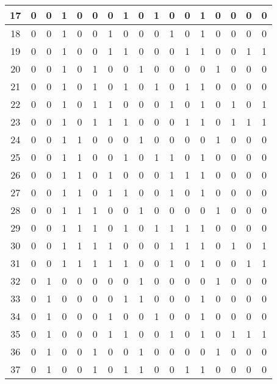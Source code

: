 \documentclass[12pt, oneside, openany]{article}
\begin{document}
{\begin{longtable}[c]{|c||c|c|c|c|c|c|c||c|c|c|c|c|c|c|c|c|}
    \hline
    17 & 0 &  0 & 1 & 0 & 0 & 0 & 1 &  0 & 1 & 0 & 0 &  1 &  0 & 0 & 0 & 0 \\
    \hline
    18 & 0 &  0 & 1 & 0 & 0 & 1 & 0 &  0 & 0 & 1 & 0 &  1 &  0 & 0 & 0 & 0 \\
    \hline
    19 & 0 &  0 & 1 & 0 & 0 & 1 & 1 &  0 & 0 & 0 & 1 &  1 &  0 & 0 & 1 & 1 \\
    \hline
    20 & 0 &  0 & 1 & 0 & 1 & 0 & 0 &  1 & 0 & 0 & 0 &  0 &  1 & 0 & 0 & 0 \\
    \hline
    21 & 0 &  0 & 1 & 0 & 1 & 0 & 1 &  0 & 1 & 0 & 1 &  1 &  0 & 0 & 0 & 0 \\
    \hline
    22 & 0 &  0 & 1 & 0 & 1 & 1 & 0 &  0 & 0 & 1 & 0 &  1 &  0 & 1 & 0 & 1 \\
    \hline
    23 & 0 &  0 & 1 & 0 & 1 & 1 & 1 &  0 & 0 & 0 & 1 &  1 &  0 & 1 & 1 & 1 \\
    \hline
    24 & 0 &  0 & 1 & 1 & 0 & 0 & 0 &  1 & 0 & 0 & 0 &  0 &  1 & 0 & 0 & 0 \\
    \hline
    25 & 0 &  0 & 1 & 1 & 0 & 0 & 1 &  0 & 1 & 1 & 0 &  1 &  0 & 0 & 0 & 0 \\
    \hline
    26 & 0 &  0 & 1 & 1 & 0 & 1 & 0 &  0 & 0 & 1 & 1 &  1 &  0 & 0 & 0 & 0 \\
    \hline
    27 & 0 &  0 & 1 & 1 & 0 & 1 & 1 &  0 & 0 & 1 & 0 &  1 &  0 & 0 & 0 & 0 \\
    \hline
    28 & 0 &  0 & 1 & 1 & 1 & 0 & 0 &  1 & 0 & 0 & 0 &  0 &  1 & 0 & 0 & 0 \\
    \hline
    29 & 0 &  0 & 1 & 1 & 1 & 0 & 1 &  0 & 1 & 1 & 1 &  1 &  0 & 0 & 0 & 0 \\
    \hline
    30 & 0 &  0 & 1 & 1 & 1 & 1 & 0 &  0 & 0 & 1 & 1 &  1 &  0 & 1 & 0 & 1 \\
    \hline
    31 & 0 &  0 & 1 & 1 & 1 & 1 & 1 &  0 & 0 & 1 & 0 &  1 &  0 & 0 & 1 & 1 \\
    \hline
    32 & 0 &  1 & 0 & 0 & 0 & 0 & 0 &  1 & 0 & 0 & 0 &  0 &  1 & 0 & 0 & 0 \\
    \hline
    33 & 0 &  1 & 0 & 0 & 0 & 0 & 1 &  1 & 0 & 0 & 0 &  1 &  0 & 0 & 0 & 0 \\
    \hline
    34 & 0 &  1 & 0 & 0 & 0 & 1 & 0 &  0 & 1 & 0 & 0 &  1 &  0 & 0 & 0 & 0 \\
    \hline
    35 & 0 &  1 & 0 & 0 & 0 & 1 & 1 &  0 & 0 & 1 & 0 &  1 &  0 & 1 & 1 & 1 \\
    \hline
    36 & 0 &  1 & 0 & 0 & 1 & 0 & 0 &  1 & 0 & 0 & 0 &  0 &  1 & 0 & 0 & 0 \\
    \hline
    37 & 0 &  1 & 0 & 0 & 1 & 0 & 1 &  1 & 0 & 0 & 1 &  1 &  0 & 0 & 0 & 0 \\

\end{longtable}}
\end{document}
